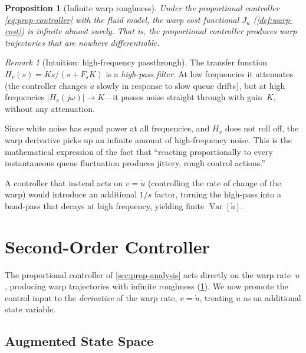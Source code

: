 \documentclass[11pt, a4paper]{article}
\theoremstyle{definition}
\theoremstyle{plain}
\newtheorem{proposition}[theorem]{Proposition}
\theoremstyle{remark}
\newtheorem{remark}{Remark}[section]
\newcommand{\Var}{\operatorname{Var}}
\begin{document}
\begin{proposition}[Infinite warp roughness]\label{prop:inf-roughness}
  Under the proportional controller \eqref{eq:prop-controller}
  with the fluid model, the warp cost functional
  $J_u$ (\cref{def:warp-cost}) is infinite almost surely.
  That is, the proportional controller produces warp trajectories
  that are nowhere differentiable.
\end{proposition}

\begin{remark}[Intuition: high-frequency passthrough]
  The transfer function $H_v(s) = Ks/(s + F_s K)$ is a
  \emph{high-pass filter}.  At low frequencies it attenuates
  (the controller changes $u$ slowly in response to slow queue
  drifts), but at high frequencies $|H_v(j\omega)| \to K$---it
  passes noise straight through with gain~$K$, without any
  attenuation.

  Since white noise has equal power at all frequencies, and $H_v$
  does not roll off, the warp derivative picks up an infinite
  amount of high-frequency noise.  This is the mathematical
  expression of the fact that ``reacting proportionally to every
  instantaneous queue fluctuation produces jittery, rough control
  actions.''

  A controller that instead acts on $v = \dot{u}$ (controlling the
  rate of change of the warp) would introduce an additional $1/s$
  factor, turning the high-pass into a band-pass that decays at
  high frequency, yielding finite $\Var[\dot{u}]$.
\end{remark}

\section{Second-Order Controller}\label{sec:second-order}

The proportional controller of \cref{sec:prop-analysis} acts directly
on the warp rate~$u$, producing warp trajectories with infinite
roughness (\cref{prop:inf-roughness}).  We now promote the control
input to the \emph{derivative} of the warp rate, $v = \dot{u}$,
treating $u$ as an additional state variable.

\subsection{Augmented State Space}\label{sec:augmented-state}
\end{document}

